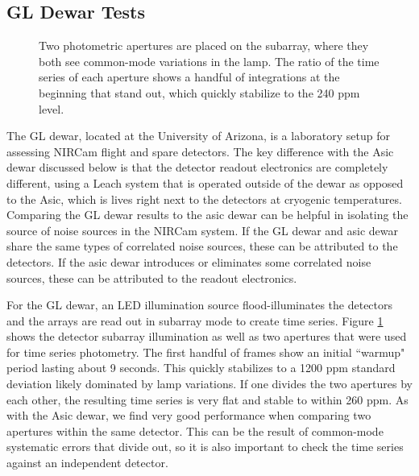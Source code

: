 \documentclass{aastex62}
\begin{document}
\clearpage
\subsection{GL Dewar Tests}
\begin{figure}
\caption{Two photometric apertures are placed on the subarray, where they both see common-mode variations in the lamp.
The ratio of the time series of each aperture shows a handful of integrations at the beginning that stand out, which quickly stabilize to the 240 ppm level.
}\label{fig:GLtSeries}
\end{figure}

The GL dewar, located at the University of Arizona, is a laboratory setup for assessing NIRCam flight and spare detectors.
The key difference with the Asic dewar discussed below is that the detector readout electronics are completely different, using a Leach system that is operated outside of the dewar as opposed to the Asic, which is lives right next to the detectors at cryogenic temperatures.
Comparing the GL dewar results to the asic dewar can be helpful in isolating the source of noise sources in the NIRCam system.
If the GL dewar and asic dewar share the same types of correlated noise sources, these can be attributed to the detectors.
If the asic dewar introduces or eliminates some correlated noise sources, these can be attributed to the readout electronics.

For the GL dewar, an LED illumination source flood-illuminates the detectors and the arrays are read out in subarray mode to create time series.
Figure \ref{fig:GLtSeries} shows the detector subarray illumination as well as two apertures that were used for time series photometry.
The first handful of frames show an initial ``warmup" period lasting about 9 seconds.
This quickly stabilizes to a 1200 ppm standard deviation likely dominated by lamp variations.
If one divides the two apertures by each other, the resulting time series is very flat and stable to within 260 ppm.
As with the Asic dewar, we find very good performance when comparing two apertures within the same detector.
This can be the result of common-mode systematic errors that divide out, so it is also important to check the time series against an independent detector.
\end{document}
